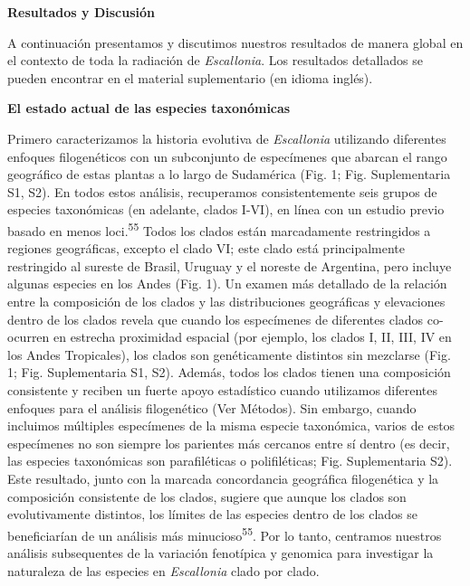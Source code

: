 \documentclass[
  11pt,
]{article}
\begin{document}
\textbf{Resultados y Discusión}

A continuación presentamos y discutimos nuestros resultados de manera global en el contexto de toda la radiación de \emph{Escallonia}. Los resultados detallados se pueden encontrar en el material suplementario (en idioma inglés).

\textbf{El estado actual de las especies taxonómicas}

Primero caracterizamos la historia evolutiva de \emph{Escallonia} utilizando diferentes enfoques filogenéticos con un subconjunto de especímenes que abarcan el rango geográfico de estas plantas a lo largo de Sudamérica (Fig. 1; Fig. Suplementaria S1, S2). En todos estos análisis, recuperamos consistentemente seis grupos de especies taxonómicas (en adelante, clados I-VI), en línea con un estudio previo basado en menos loci.\textsuperscript{55} Todos los clados están marcadamente restringidos a regiones geográficas, excepto el clado VI; este clado está principalmente restringido al sureste de Brasil, Uruguay y el noreste de Argentina, pero incluye algunas especies en los Andes (Fig. 1). Un examen más detallado de la relación entre la composición de los clados y las distribuciones geográficas y elevaciones dentro de los clados revela que cuando los especímenes de diferentes clados co-ocurren en estrecha proximidad espacial (por ejemplo, los clados I, II, III, IV en los Andes Tropicales), los clados son genéticamente distintos sin mezclarse (Fig. 1; Fig. Suplementaria S1, S2). Además, todos los clados tienen una composición consistente y reciben un fuerte apoyo estadístico cuando utilizamos diferentes enfoques para el análisis filogenético (Ver Métodos). Sin embargo, cuando incluimos múltiples especímenes de la misma especie taxonómica, varios de estos especímenes no son siempre los parientes más cercanos entre sí dentro (es decir, las especies taxonómicas son parafiléticas o polifiléticas; Fig. Suplementaria S2). Este resultado, junto con la marcada concordancia geográfica filogenética y la composición consistente de los clados, sugiere que aunque los clados son evolutivamente distintos, los límites de las especies dentro de los clados se beneficiarían de un análisis más minucioso\textsuperscript{55}. Por lo tanto, centramos nuestros análisis subsequentes de la variación fenotípica y genomica para investigar la naturaleza de las especies en \emph{Escallonia} clado por clado.
\end{document}
